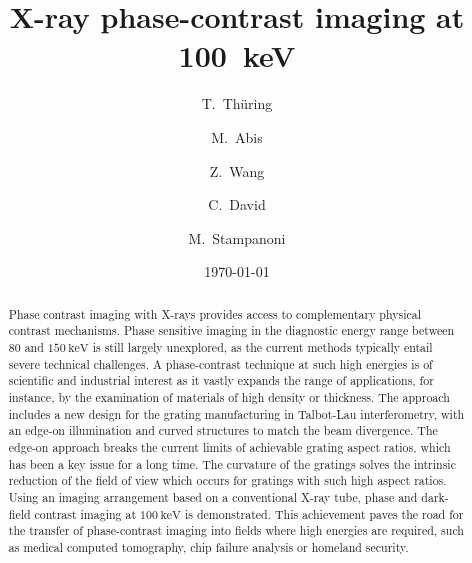 \documentclass[aip,apl,amsmath,amssymb,floatfix,reprint,a4paper]{revtex4-1}
\begin{document}
\title{X-ray phase-contrast imaging at \SI{100}{\kilo\electronvolt}}

\author{T.~Thüring}   \author{M.~Abis}
 \author{Z.~Wang}  \author{C.~David}
\author{M.~Stampanoni}  

\date{\today}


\begin{abstract} Phase contrast imaging with X-rays provides access to
    complementary physical contrast mechanisms. Phase sensitive imaging in
    the diagnostic energy range between $80$ and
    $\SI{150}{\kilo\electronvolt}$ is still largely unexplored, as the
    current methods typically entail severe technical challenges. A
    phase-contrast technique at such high energies is of scientific and
    industrial interest as it vastly expands the range of applications, for
    instance, by the examination of materials of high density or thickness.
    The approach includes a new design for the grating manufacturing in
    Talbot-Lau interferometry, with an edge-on illumination and curved
    structures to match the beam divergence. The edge-on approach breaks the
    current limits of achievable grating aspect ratios, which has been a key
    issue for a long time. The curvature of the gratings solves the
    intrinsic reduction of the field of view which occurs for gratings with
    such high aspect ratios. Using an imaging arrangement based on a
    conventional X-ray tube, phase and dark-field contrast imaging at
    $\SI{100}{\kilo\electronvolt}$ is demonstrated. This achievement paves
    the road for the transfer of phase-contrast imaging into fields where
    high energies are required, such as medical computed tomography, chip
    failure analysis or homeland security. \end{abstract}
\end{document}
